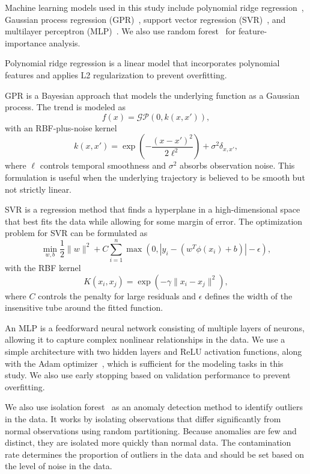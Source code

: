 Machine learning models used in this study include polynomial ridge regression~\cite{hoerl1970ridge}, Gaussian process regression (GPR)~\cite{seeger2004gaussian}, support vector regression (SVR)~\cite{smola2004tutorial}, and multilayer perceptron (MLP)~\cite{goodfellow2016deep}. We also use random forest~\cite{breiman2001random} for feature-importance analysis.

Polynomial ridge regression is a linear model that incorporates polynomial features and applies L2 regularization to prevent overfitting.

GPR is a Bayesian approach that models the underlying function as a Gaussian process. The trend is modeled as
\begin{equation}
	f(x) = \mathcal{GP}(0, k(x, x')),
\end{equation}
with an RBF-plus-noise kernel
\begin{equation}
	k(x, x') = \exp \left( -\frac{(x - x')^2}{2 \ell^2} \right) + \sigma^2 \delta_{x, x'},
\end{equation}
where $\ell$ controls temporal smoothness and $\sigma^2$ absorbs observation noise. This formulation is useful when the underlying trajectory is believed to be smooth but not strictly linear.

SVR is a regression method that finds a hyperplane in a high-dimensional space that best fits the data while allowing for some margin of error. The optimization problem for SVR can be formulated as
\begin{equation}
	\min_{w, b} \frac{1}{2} \| w \|^2 + C \sum_{i=1}^n \max(0, |y_i - (w^T \phi(x_i) + b)| - \epsilon),
\end{equation}
with the RBF kernel
\begin{equation}
	K(x_i, x_j) = \exp \left( -\gamma \| x_i - x_j \|^2 \right),
\end{equation}
where \(C\) controls the penalty for large residuals and \(\epsilon\) defines the width of the insensitive tube around the fitted function.

An MLP is a feedforward neural network consisting of multiple layers of neurons, allowing it to capture complex nonlinear relationships in the data. We use a simple architecture with two hidden layers and ReLU activation functions, along with the Adam optimizer~\cite{kingma2014adam}, which is sufficient for the modeling tasks in this study. We also use early stopping based on validation performance to prevent overfitting.

We also use isolation forest~\cite{liu2008isolation} as an anomaly detection method to identify outliers in the data. It works by isolating observations that differ significantly from normal observations using random partitioning. Because anomalies are few and distinct, they are isolated more quickly than normal data. The contamination rate determines the proportion of outliers in the data and should be set based on the level of noise in the data.

